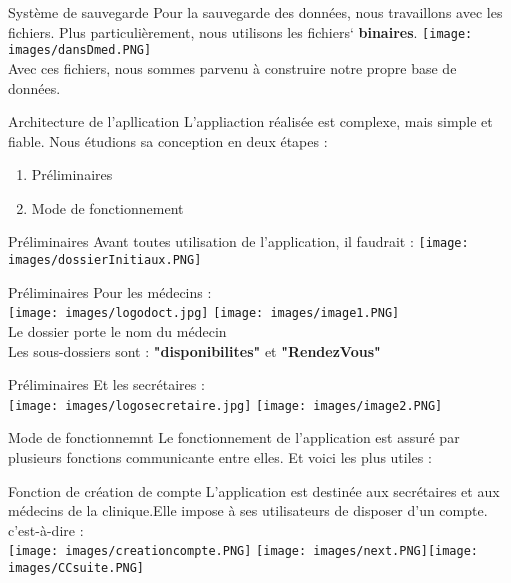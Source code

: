 \documentclass{beamer}
\begin{document}
\begin{frame}{Système de sauvegarde}
\pause Pour la sauvegarde des données, nous travaillons avec les fichiers. \pause
Plus particulièrement, nous utilisons les fichiers`\textbf{ binaires}.
\texttt{[image: images/dansDmed.PNG]}\\ \pause
Avec ces fichiers, nous sommes parvenu à construire notre propre base de données.
\end{frame}
\begin{frame}[t]{Architecture de l'apllication}
L'appliaction réalisée est complexe, mais simple et fiable. Nous étudions sa conception en deux étapes :
\begin{enumerate}
\item Préliminaires \pause
\item Mode de fonctionnement 
\end{enumerate}
\end{frame}

\begin{frame}{Préliminaires}
Avant toutes utilisation de l'application, il faudrait : \pause
\texttt{[image: images/dossierInitiaux.PNG]}\\
\end{frame}
\begin{frame}{Préliminaires}
Pour les médecins : \\ 
\texttt{[image: images/logodoct.jpg]} \texttt{[image: images/image1.PNG]}\\ \pause
Le dossier porte le nom du médecin\\ \pause
Les sous-dossiers sont : \textbf{"disponibilites"} et \textbf{"RendezVous"}
\end{frame}
\begin{frame}{Préliminaires}
Et les secrétaires : \\
\texttt{[image: images/logosecretaire.jpg]} \texttt{[image: images/image2.PNG]}

\end{frame}

\begin{frame}{Mode de fonctionnemnt}
Le fonctionnement de l'application est assuré par plusieurs fonctions communicante entre elles. Et voici les plus utiles : 
\end{frame}

\begin{frame}{Fonction de création de compte}
L'application est destinée aux secrétaires et aux médecins de la clinique.Elle impose à ses utilisateurs de disposer d'un compte.\\
c'est-à-dire : \\ \pause
\texttt{[image: images/creationcompte.PNG]} \texttt{[image: images/next.PNG]}\texttt{[image: images/CCsuite.PNG]} 
\end{frame}
\end{document}
